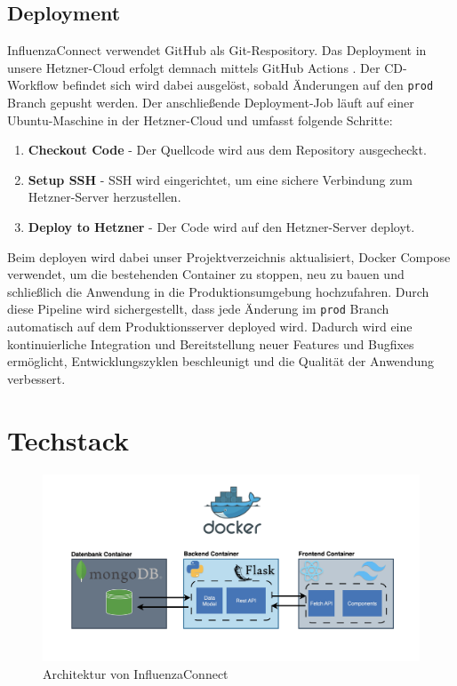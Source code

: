 \documentclass[conference,a4paper,flushend]{cs-techrep}
\begin{document}
\subsection{Deployment}
InfluenzaConnect verwendet GitHub \cite{GitHub} als Git-Respository. Das Deployment in unsere Hetzner-Cloud \cite{noauthor_gunstiges_nodate} erfolgt demnach mittels GitHub Actions \cite{GitHubActions}. Der CD-Workflow befindet sich wird dabei ausgelöst, sobald Änderungen auf den \texttt{prod} Branch gepusht werden. Der anschließende Deployment-Job läuft auf einer Ubuntu-Maschine in der Hetzner-Cloud und umfasst folgende Schritte:
\begin{enumerate}
\item{\textbf{Checkout Code} - Der Quellcode wird aus dem Repository ausgecheckt.}
\item{\textbf{Setup SSH} - SSH wird eingerichtet, um eine sichere Verbindung zum Hetzner-Server
herzustellen.}
\item{\textbf{Deploy to Hetzner} - Der Code wird auf den Hetzner-Server deployt.}
\end{enumerate}
Beim deployen wird dabei unser Projektverzeichnis aktualisiert, Docker Compose \cite{docker-compose} verwendet, um die bestehenden Container zu stoppen, neu zu bauen und schließlich die Anwendung in die Produktionsumgebung hochzufahren.
Durch diese Pipeline wird sichergestellt, dass jede Änderung im \texttt{prod} Branch automatisch auf dem Produktionsserver deployed wird. Dadurch wird eine kontinuierliche Integration und Bereitstellung neuer Features und Bugfixes ermöglicht, Entwicklungszyklen beschleunigt und die Qualität der Anwendung verbessert.


\section{Techstack}

\begin{figure}[h]
	\centering
	\includegraphics[width=\linewidth]{../Bilder/Architektur.png}
	\caption{Architektur von InfluenzaConnect}
	\label{fig:Architektur}
\end{figure}
\end{document}
